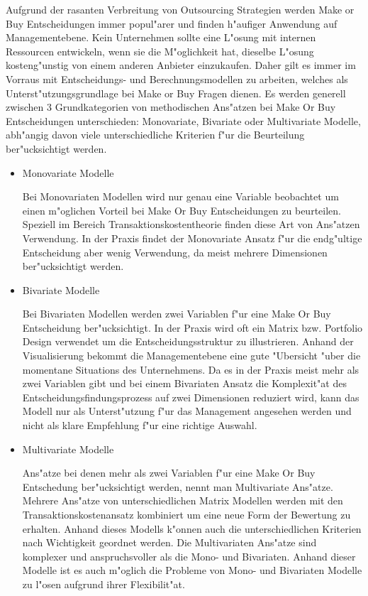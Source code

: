Aufgrund der rasanten Verbreitung von Outsourcing Strategien werden Make or Buy Entscheidungen immer popul"arer und finden h"aufiger Anwendung auf Managementebene. Kein Unternehmen sollte eine L"osung mit internen Ressourcen entwickeln, wenn sie die M"oglichkeit hat, dieselbe L"osung kosteng"unstig von einem anderen Anbieter einzukaufen. Daher gilt es immer im Vorraus mit Entscheidungs- und Berechnungsmodellen zu arbeiten, welches als Unterst"utzungsgrundlage bei Make or Buy Fragen dienen. Es werden generell zwischen 3 Grundkategorien von methodischen Ans"atzen bei Make Or Buy Entscheidungen unterschieden: Monovariate, Bivariate oder Multivariate Modelle, abh"angig davon viele unterschiedliche Kriterien f"ur die Beurteilung ber"ucksichtigt werden.\cite{GeVo2009}

\begin{itemize}
	\item Monovariate Modelle
	
	Bei Monovariaten Modellen wird nur genau eine Variable beobachtet um einen m"oglichen Vorteil bei Make Or Buy Entscheidungen zu beurteilen. Speziell im Bereich Transaktionskostentheorie finden diese Art von Ans"atzen Verwendung. In der Praxis findet der Monovariate Ansatz f"ur die endg"ultige Entscheidung aber wenig Verwendung, da meist mehrere Dimensionen ber"ucksichtigt werden.
	
	\item Bivariate Modelle
	
	Bei Bivariaten Modellen werden zwei Variablen f"ur eine Make Or Buy Entscheidung ber"ucksichtigt. In der Praxis wird oft ein Matrix bzw. Portfolio Design verwendet um die Entscheidungsstruktur zu illustrieren. Anhand der Visualisierung bekommt die Managementebene eine gute "Ubersicht "uber die momentane Situations des Unternehmens. Da es in der Praxis meist mehr als zwei Variablen gibt und bei einem Bivariaten Ansatz die Komplexit"at des Entscheidungsfindungsprozess auf zwei Dimensionen reduziert wird, kann das Modell nur als Unterst"utzung f"ur das Management angesehen werden und nicht als klare Empfehlung f"ur eine richtige Auswahl.
	
	\item Multivariate Modelle
	
	Ans"atze bei denen mehr als zwei Variablen f"ur eine Make Or Buy Entschedung ber"ucksichtigt werden, nennt man Multivariate Ans"atze. Mehrere Ans"atze von unterschiedlichen Matrix Modellen werden mit den Transaktionskostenansatz kombiniert um eine neue Form der Bewertung zu erhalten. Anhand dieses Modells k"onnen auch die unterschiedlichen Kriterien nach Wichtigkeit geordnet werden. Die Multivariaten Ans"atze sind komplexer und anspruchsvoller als die Mono- und Bivariaten. Anhand dieser Modelle ist es auch m"oglich die Probleme von Mono- und Bivariaten Modelle zu l"osen aufgrund ihrer Flexibilit"at.
\end{itemize} 

	